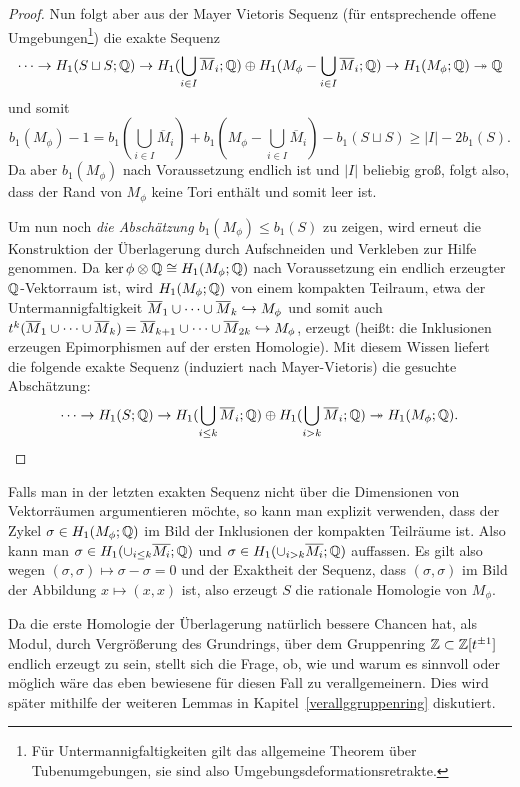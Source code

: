\begin{proof}
	 \noindent Nun folgt aber aus der Mayer Vietoris Sequenz (für entsprechende offene Umgebungen\footnote{Für Untermannigfaltigkeiten gilt das allgemeine Theorem über Tubenumgebungen, sie sind also Umgebungsdeformationsretrakte.}) die exakte Sequenz
	  \[
	  	\cdots\to H_1(S\sqcup S;\mathbb{Q}) \to H_1(\bigcup_{i \in I} \overline M_i;\mathbb{Q}) \oplus H_1(M_\phi -\bigcup_{i \in I} \overline M_i;\mathbb{Q}) \to H_1(M_\phi;\mathbb{Q}) \twoheadrightarrow \mathbb{Q}
	  \]
	  und somit
	  \[
	  	b_1(M_\phi) -1= b_1(\bigcup_{i \in I} \overline M_i)+b_1(M_\phi -\bigcup_{i \in I} \overline M_i)-b_1(S\sqcup S) \geq |I| -2b_1(S).
	  \]
	  Da aber $b_1(M_\phi)$ nach Voraussetzung endlich ist und $|I|$ beliebig groß, folgt also, dass der Rand von $M_\phi$ keine Tori enthält und somit leer ist.

	  Um nun noch\emph{ die Abschätzung $b_1(M_\phi) \leq b_1(S)$ }zu zeigen, wird erneut die Konstruktion der Überlagerung durch Aufschneiden und Verkleben zur Hilfe genommen. Da $\ker\phi \otimes \mathbb{Q} \cong H_1(M_\phi;\mathbb{Q})$ nach Voraussetzung ein endlich erzeugter $\mathbb{Q}$-Vektorraum ist, wird $H_1(M_\phi;\mathbb{Q})$ von einem kompakten Teilraum, etwa der Untermannigfaltigkeit $\overline M_1 \cup \cdots \cup \overline M_k \hookrightarrow M_\phi$ und somit auch $t^k(\overline M_1 \cup \cdots \cup \overline M_k )  = \overline M_{k+1} \cup \cdots \cup \overline M_{2k}\hookrightarrow M_\phi$, erzeugt (heißt: die Inklusionen erzeugen Epimorphismen auf der ersten Homologie). Mit diesem Wissen liefert die folgende exakte Sequenz (induziert nach Mayer-Vietoris) die gesuchte Abschätzung:
	  \[
	  	\cdots \to H_1(S;\mathbb{Q}) \to H_1(\bigcup_{i\leq k}\overline M_i;\mathbb{Q}) \oplus H_1(\bigcup_{i>k} \overline M_i;\mathbb{Q}) \twoheadrightarrow H_1(M_\phi;\mathbb{Q}).
	  \]
\end{proof}
\begin{bem}
	Falls man in der letzten exakten Sequenz nicht über die Dimensionen von Vektorräumen argumentieren möchte, so kann man explizit verwenden, dass der Zykel $\sigma \in H_1(M_\phi;\mathbb{Q})$ im Bild der Inklusionen der kompakten Teilräume ist. Also kann man $\sigma \in H_1(\cup_{i\leq k} \overline{M_i};\mathbb{Q})$ und $\sigma \in H_1(\cup_{i > k} \overline{M_i};\mathbb{Q})$ auffassen. Es gilt also wegen $(\sigma,\sigma) \mapsto \sigma-\sigma=0$  und der Exaktheit der Sequenz, dass $(\sigma,\sigma)$ im Bild der Abbildung $x \mapsto (x,x)$ ist, also erzeugt $S$ die rationale Homologie von $M_\phi$.
\end{bem}
\begin{bem}
Da die erste Homologie der Überlagerung natürlich bessere Chancen hat, als Modul, durch Vergrößerung des Grundrings, über dem Gruppenring $\mathbb{Z}\subset \mathbb{Z}[t^{\pm 1}]$ endlich erzeugt zu sein, stellt sich die Frage, ob, wie und warum es sinnvoll oder möglich wäre das eben bewiesene für diesen Fall zu verallgemeinern. Dies wird später mithilfe der weiteren Lemmas in Kapitel~\ref{verallggruppenring} diskutiert. 
\end{bem}
